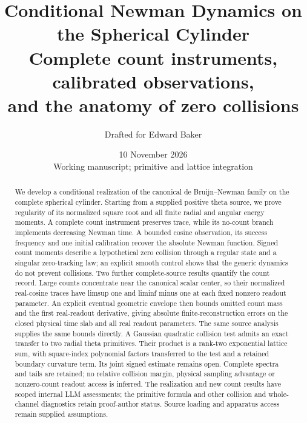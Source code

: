 \documentclass[11pt]{article}
\title{Conditional Newman Dynamics on the Spherical Cylinder\\[4pt]
\large Complete count instruments, calibrated observations,\\
and the anatomy of zero collisions}
\author{Drafted for Edward Baker}
\date{10 November 2026\\\small Working manuscript; primitive and lattice integration}
\theoremstyle{definition}
\theoremstyle{remark}
\numberwithin{equation}{section}
\begin{document}
\maketitle
\begin{abstract}
We develop a conditional realization of the canonical de Bruijn--Newman
family on the complete spherical cylinder. Starting from a supplied positive
theta source, we prove regularity of its normalized square root and all
finite radial and angular energy moments. A complete count instrument
preserves trace, while its no-count branch implements decreasing Newman
time. A bounded cosine observation, its success frequency and one initial
calibration recover the absolute Newman function. Signed count moments
describe a hypothetical zero collision through a regular state and a
singular zero-tracking law; an explicit smooth control shows that the
generic dynamics do not prevent collisions. Two further complete-source
results quantify the count record. Large counts concentrate near the
canonical scalar center, so their normalized real-cosine traces have
limsup one and liminf minus one at each fixed nonzero readout parameter.
An explicit eventual geometric envelope then bounds omitted count mass
and the first real-readout derivative, giving absolute finite-reconstruction
errors on the closed physical time slab and all real readout parameters.
The same source analysis supplies the same bounds directly. A Gaussian
quadratic collision test admits an exact transfer to two radial theta
primitives. Their product is a rank-two exponential lattice sum, with
square-index polynomial factors transferred to the test and a retained
boundary curvature term. Its joint signed estimate remains open. Complete
spectra and tails are retained; no relative collision margin, physical
sampling advantage or nonzero-count readout access is inferred. The
realization and new count results have scoped internal LLM assessments;
the primitive formula and other collision and whole-channel diagnostics
retain proof-author status.
Source loading and apparatus access remain supplied assumptions.
\end{abstract}
\clearpage
\tableofcontents
\clearpage










\end{document}
